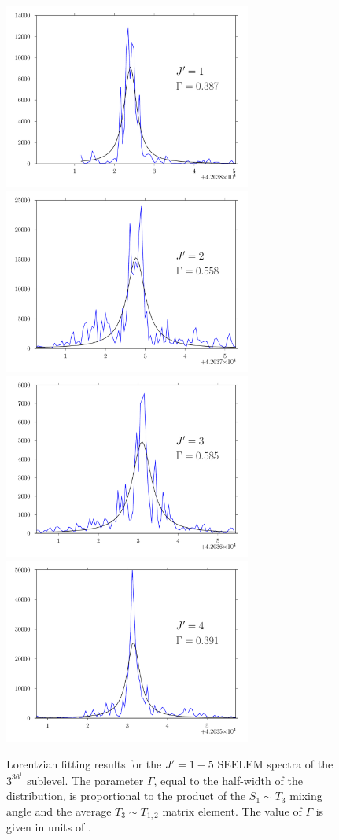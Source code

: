 \begin{figure}
  \caption{Lorentzian fitting results for the $J'=1-5$ SEELEM spectra
    of the $3^36^1$  sublevel.  The parameter $\Gamma$, equal to
    the half-width of the distribution, is proportional to the product
    of the $S_1 \sim T_3$ mixing angle and the average $T_3 \sim T_{1,2}$
    matrix element.  The value of $\Gamma$ is given in units of \rcm.}
  \label{fig:seelem-fits}
  \vspace{5mm}
  \includegraphics[width=3.2in]{3361-q1-seelemfit}
  \includegraphics[width=3.2in]{3361-q2-seelemfit}
  \includegraphics[width=3.2in]{3361-q3-seelemfit}
  \includegraphics[width=3.2in]{3361-q4-seelemfit}

\end{figure}

